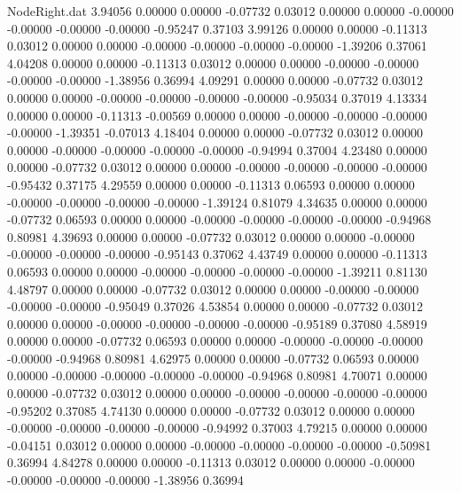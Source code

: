 \begin{filecontents}{NodeRight.dat}
   3.94056    0.00000    0.00000    -0.07732    0.03012    0.00000    0.00000   -0.00000   -0.00000   -0.00000   -0.00000   -0.95247    0.37103
   3.99126    0.00000    0.00000    -0.11313    0.03012    0.00000    0.00000   -0.00000   -0.00000   -0.00000   -0.00000   -1.39206    0.37061
   4.04208    0.00000    0.00000    -0.11313    0.03012    0.00000    0.00000   -0.00000   -0.00000   -0.00000   -0.00000   -1.38956    0.36994
   4.09291    0.00000    0.00000    -0.07732    0.03012    0.00000    0.00000   -0.00000   -0.00000   -0.00000   -0.00000   -0.95034    0.37019
   4.13334    0.00000    0.00000    -0.11313   -0.00569    0.00000    0.00000   -0.00000   -0.00000   -0.00000   -0.00000   -1.39351   -0.07013
   4.18404    0.00000    0.00000    -0.07732    0.03012    0.00000    0.00000   -0.00000   -0.00000   -0.00000   -0.00000   -0.94994    0.37004
   4.23480    0.00000    0.00000    -0.07732    0.03012    0.00000    0.00000   -0.00000   -0.00000   -0.00000   -0.00000   -0.95432    0.37175
   4.29559    0.00000    0.00000    -0.11313    0.06593    0.00000    0.00000   -0.00000   -0.00000   -0.00000   -0.00000   -1.39124    0.81079
   4.34635    0.00000    0.00000    -0.07732    0.06593    0.00000    0.00000   -0.00000   -0.00000   -0.00000   -0.00000   -0.94968    0.80981
   4.39693    0.00000    0.00000    -0.07732    0.03012    0.00000    0.00000   -0.00000   -0.00000   -0.00000   -0.00000   -0.95143    0.37062
   4.43749    0.00000    0.00000    -0.11313    0.06593    0.00000    0.00000   -0.00000   -0.00000   -0.00000   -0.00000   -1.39211    0.81130
   4.48797    0.00000    0.00000    -0.07732    0.03012    0.00000    0.00000   -0.00000   -0.00000   -0.00000   -0.00000   -0.95049    0.37026
   4.53854    0.00000    0.00000    -0.07732    0.03012    0.00000    0.00000   -0.00000   -0.00000   -0.00000   -0.00000   -0.95189    0.37080
   4.58919    0.00000    0.00000    -0.07732    0.06593    0.00000    0.00000   -0.00000   -0.00000   -0.00000   -0.00000   -0.94968    0.80981
   4.62975    0.00000    0.00000    -0.07732    0.06593    0.00000    0.00000   -0.00000   -0.00000   -0.00000   -0.00000   -0.94968    0.80981
   4.70071    0.00000    0.00000    -0.07732    0.03012    0.00000    0.00000   -0.00000   -0.00000   -0.00000   -0.00000   -0.95202    0.37085
   4.74130    0.00000    0.00000    -0.07732    0.03012    0.00000    0.00000   -0.00000   -0.00000   -0.00000   -0.00000   -0.94992    0.37003
   4.79215    0.00000    0.00000    -0.04151    0.03012    0.00000    0.00000   -0.00000   -0.00000   -0.00000   -0.00000   -0.50981    0.36994
   4.84278    0.00000    0.00000    -0.11313    0.03012    0.00000    0.00000   -0.00000   -0.00000   -0.00000   -0.00000   -1.38956    0.36994

\end{filecontents}
